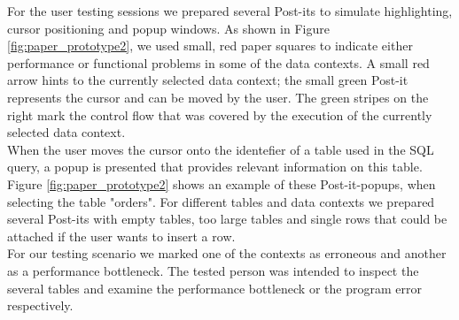 For the user testing sessions we prepared several Post-its to simulate highlighting, cursor positioning and popup windows. 
As shown in Figure \ref{fig:paper_prototype2}, we used small, red paper squares to indicate either performance or functional problems in some of the data contexts. 
A small red arrow hints to the currently selected data context; the small green Post-it represents the cursor and can be moved by the user. 
The green stripes on the right mark the control flow that was covered by the execution of the currently selected data context. \\

When the user moves the cursor onto the identefier of a table used in the SQL query, a popup is presented that provides relevant information on this table.
Figure \ref{fig:paper_prototype2} shows an example of these Post-it-popups, when selecting the table "orders". 
For different tables and data contexts we prepared several Post-its with empty tables, too large tables and single rows that could be attached if the user wants to insert a row.\\

For our testing scenario we marked one of the contexts as erroneous and another as a performance bottleneck. 
The tested person was intended to inspect the several tables and examine the performance bottleneck or the program error respectively.








